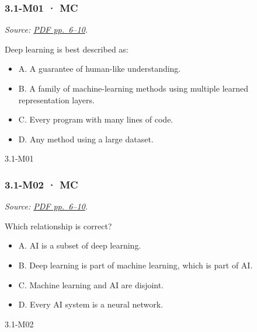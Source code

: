 \noindent\begin{minipage}{\linewidth}

\subsubsection{3.1-M01 · MC}\label{m01-mc-7}

\emph{Source:
\href{../Lecture\%20Slides/3.1.\%20Introduction\%20to\%20Deep\%20Learning.pdf\#page=6}{PDF
pp.~6--10}.}

Deep learning is best described as:

\begin{itemize}
\tightlist
\item
  A. A guarantee of human-like understanding.
\item
  B. A family of machine-learning methods using multiple learned
  representation layers.
\item
  C. Every program with many lines of code.
\item
  D. Any method using a large dataset.
\end{itemize}

\begin{solution}[8mm]{3.1-M01}

\end{solution}
\end{minipage}\par\medskip

\noindent\begin{minipage}{\linewidth}

\subsubsection{3.1-M02 · MC}\label{m02-mc-7}

\emph{Source:
\href{../Lecture\%20Slides/3.1.\%20Introduction\%20to\%20Deep\%20Learning.pdf\#page=6}{PDF
pp.~6--10}.}

Which relationship is correct?

\begin{itemize}
\tightlist
\item
  A. AI is a subset of deep learning.
\item
  B. Deep learning is part of machine learning, which is part of AI.
\item
  C. Machine learning and AI are disjoint.
\item
  D. Every AI system is a neural network.
\end{itemize}

\begin{solution}[8mm]{3.1-M02}

\end{solution}
\end{minipage}\par\medskip


